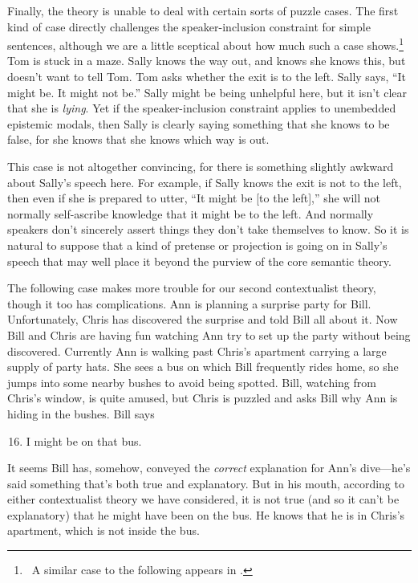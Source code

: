 Finally, the theory is unable to deal with certain sorts of puzzle cases. The first kind of case directly challenges the speaker-inclusion constraint for simple sentences, although we are a little sceptical about how much such a case shows.\footnote{\ A similar case to the following appears in \cite[27]{Hawthorne2004}. } Tom is stuck in a maze. Sally knows the way out, and knows she knows this, but doesn't want to tell Tom. Tom asks whether the exit is to the left. Sally says, ``It might be. It might not be.'' Sally might be being unhelpful here, but it isn't clear that she is \textit{lying}. Yet if the speaker-inclusion constraint applies to unembedded epistemic modals, then Sally is clearly saying something that she knows to be false, for she knows that she knows which way is out. 
 
This case is not altogether convincing, for there is something slightly awkward about Sally's speech here. For example, if Sally knows the exit is not to the left, then even if she is prepared to utter, ``It might be [to the left],'' she will not normally self-ascribe knowledge that it might be to the left. And normally speakers don't sincerely assert things they don't take themselves to know. So it is natural to suppose that a kind of pretense or projection is going on in Sally's speech that may well place it beyond the purview of the core semantic theory.
 
The following case makes more trouble for our second contextualist theory, though it too has complications. Ann is planning a surprise party for Bill. Unfortunately, Chris has discovered the surprise and told Bill all about it. Now Bill and Chris are having fun watching Ann try to set up the party without being discovered. Currently Ann is walking past Chris's apartment carrying a large supply of party hats. She sees a bus on which Bill frequently rides home, so she jumps into some nearby bushes to avoid being spotted. Bill, watching from Chris's window, is quite amused, but Chris is puzzled and asks Bill why Ann is hiding in the bushes. Bill says
 
\begin{enumerate}
\setcounter{enumi}{15}
\item I might be on that bus.
\end{enumerate}

\noindent It seems Bill has, somehow, conveyed the \textit{correct} explanation for Ann's dive---he's said something that's both true and explanatory. But in his mouth, according to either contextualist theory we have considered, it is not true (and so it can't be explanatory) that he might have been on the bus. He knows that he is in Chris's apartment, which is not inside the bus.
 
